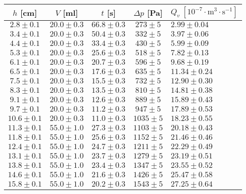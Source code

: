 \documentclass[a4paper]{article}
\begin{document}
\begin{center}
    \label{tab:title}
    \begin{tabular}{ | c | c | c | c |  p{3cm} |} \hline
    $h$ [cm] & $V$ [ml] & $t$ [s]& $\Delta p$ [Pa] & $Q_{v} \: [10^{-7} \cdot \mathrm{m^{3} \cdot s^{-1}}]$   \\ \hline
    $2.8\pm0.1$ & $20.0\pm0.3$ & $66.8\pm0.3$ & $273\pm5$ & $2.99\pm0.04$ \\ \hline
    $3.4\pm0.1$ & $20.0\pm0.3$ & $50.4\pm0.3$ & $332\pm5$ & $3.97\pm0.06$ \\ \hline
    $4.4\pm0.1$ & $20.0\pm0.3$ & $33.4\pm0.3$ & $430\pm5$ & $5.99\pm0.09$ \\ \hline
    $5.3\pm0.1$ & $20.0\pm0.3$ & $25.6\pm0.3$ & $518\pm5$ & $7.82\pm0.13$ \\ \hline
    $6.1\pm0.1$ & $20.0\pm0.3$ & $20.7\pm0.3$ & $596\pm5$ & $9.68\pm0.19$ \\ \hline
    $6.5\pm0.1$ & $20.0\pm0.3$ & $17.6\pm0.3$ & $635\pm5$ & $11.34\pm0.24$ \\ \hline
    $7.5\pm0.1$ & $20.0\pm0.3$ & $15.5\pm0.3$ & $732\pm5$ & $12.90\pm0.30$ \\ \hline
    $8.3\pm0.1$ & $20.0\pm0.3$ & $13.5\pm0.3$ & $810\pm5$ & $14.81\pm0.38$ \\ \hline
    $9.1\pm0.1$ & $20.0\pm0.3$ & $12.6\pm0.3$ & $889\pm5$ & $15.89\pm0.43$ \\ \hline
    $9.7\pm0.1$ & $20.0\pm0.3$ & $11.2\pm0.3$ & $947\pm5$ & $17.89\pm0.53$ \\ \hline
    $10.6\pm0.1$ & $20.0\pm0.3$ & $11.0\pm0.3$ & $1035\pm5$ & $18.23\pm0.55$ \\ \hline
    $11.3\pm0.1$ & $55.0\pm1.0$ & $27.3\pm0.3$ & $1103\pm5$ & $20.18\pm0.43$ \\ \hline
    $11.8\pm0.1$ & $55.0\pm1.0$ & $25.6\pm0.3$ & $1152\pm5$ & $21.46\pm0.46$ \\ \hline
    $12.4\pm0.1$ & $55.0\pm1.0$ & $24.7\pm0.3$ & $1211\pm5$ & $22.29\pm0.49$ \\ \hline
    $13.1\pm0.1$ & $55.0\pm1.0$ & $23.7\pm0.3$ & $1279\pm5$ & $23.19\pm0.51$ \\ \hline
    $13.8\pm0.1$ & $55.0\pm1.0$ & $23.4\pm0.3$ & $1347\pm5$ & $23.55\pm0.52$ \\ \hline
    $14.6\pm0.1$ & $55.0\pm1.0$ & $21.6\pm0.3$ & $1426\pm5$ & $25.47\pm0.58$ \\ \hline
    $15.8\pm0.1$ & $55.0\pm1.0$ & $20.2\pm0.3$ & $1543\pm5$ & $27.25\pm0.64$ \\ \hline

\end{tabular}
\end{center}
\end{document}
